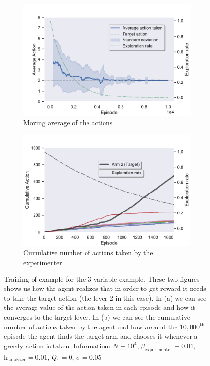\documentclass[11pt,a4paper,twoside]{report}
\newcommand{\+}{\textnormal{+} }
\theoremstyle{definition}
\numberwithin{equation}{chapter}
\begin{document}
    \begin{figure}[]
      \centering
      \begin{subfigure}{.5\textwidth}
        \centering
        \includegraphics[width=1\linewidth]{figures/Actions-MAB4.pdf}
        \caption{Moving average of the actions}
        \label{fig:ActionAverageMAB4}
      \end{subfigure}%
      \begin{subfigure}{.5\textwidth}
        \centering
        \includegraphics[width=1\linewidth]{figures/Cum-action-MAB4.pdf}
        \caption{Cumulative number of actions taken by the experimenter}
        \label{fig:actionsMAB4}
      \end{subfigure}
      \caption{Training of example for the 3-variable example. These two figures
      shows us how the agent realizes that in order to get reward it needs to
      take the target action (the lever 2 in this case). In (a) we can see the
      average value of the action taken in each episode and how it converges to
      the target lever. In (b) we can see the cumulative number of actions taken
      by the agent and how around the $10,000^\text{th}$ episode the agent finds
      the target arm and chooses it whenever a greedy action is taken.
      Information: $N=10^4$, $\beta_\text{experimenter}=0.01$,
      $\text{lr}_\text{analyzer}=0.01$, $Q_1=0$, $\sigma=0.05$}
    \end{figure}
\end{document}
